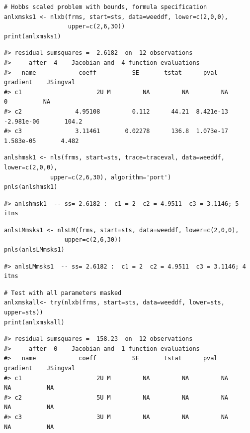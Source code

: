 \begin{verbatim}
# Hobbs scaled problem with bounds, formula specification
anlxmsks1 <- nlxb(frms, start=sts, data=weeddf, lower=c(2,0,0),
                  upper=c(2,6,30))
print(anlxmsks1)
\end{verbatim}

\begin{verbatim}
#> residual sumsquares =  2.6182  on  12 observations
#>     after  4    Jacobian and  4 function evaluations
#>   name            coeff          SE       tstat      pval      gradient    JSingval   
#> c1                     2U M         NA         NA         NA           0          NA  
#> c2               4.95108         0.112      44.21  8.421e-13  -2.981e-06       104.2  
#> c3               3.11461       0.02278      136.8  1.073e-17   1.583e-05       4.482
\end{verbatim}

\begin{verbatim}
anlshmsk1 <- nls(frms, start=sts, trace=traceval, data=weeddf, lower=c(2,0,0),
             upper=c(2,6,30), algorithm='port')
pnls(anlshmsk1)
\end{verbatim}

\begin{verbatim}
#> anlshmsk1  -- ss= 2.6182 :  c1 = 2  c2 = 4.9511  c3 = 3.1146; 5  itns
\end{verbatim}

\begin{verbatim}
anlsLMmsks1 <- nlsLM(frms, start=sts, data=weeddf, lower=c(2,0,0),
                 upper=c(2,6,30))
pnls(anlsLMmsks1)
\end{verbatim}

\begin{verbatim}
#> anlsLMmsks1  -- ss= 2.6182 :  c1 = 2  c2 = 4.9511  c3 = 3.1146; 4  itns
\end{verbatim}

\begin{verbatim}
# Test with all parameters masked
anlxmskall<- try(nlxb(frms, start=sts, data=weeddf, lower=sts, upper=sts))
print(anlxmskall)
\end{verbatim}

\begin{verbatim}
#> residual sumsquares =  158.23  on  12 observations
#>     after  0    Jacobian and  1 function evaluations
#>   name            coeff          SE       tstat      pval      gradient    JSingval   
#> c1                     2U M         NA         NA         NA          NA          NA  
#> c2                     5U M         NA         NA         NA          NA          NA  
#> c3                     3U M         NA         NA         NA          NA          NA
\end{verbatim}

